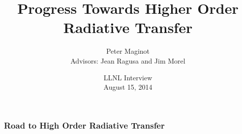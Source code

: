 \documentclass{beamer}
\title{Progress Towards Higher Order Radiative Transfer}
\author{Peter Maginot \\ Advisors: Jean Ragusa and Jim Morel}\institute{Texas A\&M University- Department of Nuclear Engineering}
\date{LLNL Interview \\ August 15, 2014 }
\newif\ifplacelogo %
\begin{document}
\placelogotrue
\begin{frame}
\titlepage
\end{frame}

\placelogofalse


\begin{frame}
\frametitle{Road to High Order Radiative Transfer}
\tableofcontents[hideallsubsections]
\end{frame}




\end{document}
